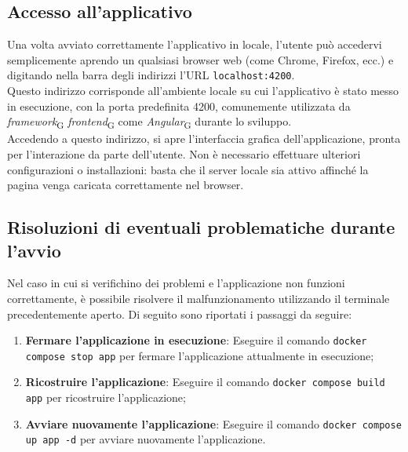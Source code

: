 \subsection{Accesso all'applicativo}
Una volta avviato correttamente l’applicativo in locale, l’utente può accedervi semplicemente aprendo un qualsiasi browser web (come Chrome, Firefox, ecc.) e digitando nella barra degli indirizzi l’URL \texttt{localhost:4200}. \\
Questo indirizzo corrisponde all’ambiente locale su cui l’applicativo è stato messo in esecuzione, con la porta predefinita 4200, comunemente utilizzata da \textit{framework}\textsubscript{G} \textit{frontend}\textsubscript{G} come \textit{Angular}\textsubscript{G} durante lo sviluppo. \\
Accedendo a questo indirizzo, si apre l’interfaccia grafica dell’applicazione, pronta per l’interazione da parte dell’utente. Non è necessario effettuare ulteriori configurazioni o installazioni: basta che il server locale sia attivo affinché la pagina venga caricata correttamente nel browser.

\subsection{Risoluzioni di eventuali problematiche durante l'avvio}
Nel caso in cui si verifichino dei problemi e l'applicazione non funzioni correttamente, è possibile risolvere il malfunzionamento utilizzando il terminale precedentemente aperto. Di seguito sono riportati i passaggi da seguire:
\begin{enumerate}
    \item \textbf{Fermare l'applicazione in esecuzione}: Eseguire il comando \texttt{docker compose stop app} per fermare l'applicazione attualmente in esecuzione;
    \item \textbf{Ricostruire l'applicazione}: Eseguire il comando \texttt{docker compose build app} per ricostruire l'applicazione;
    \item \textbf{Avviare nuovamente l'applicazione}: Eseguire il comando \texttt{docker compose up app -d} per avviare nuovamente l'applicazione.
\end{enumerate}

